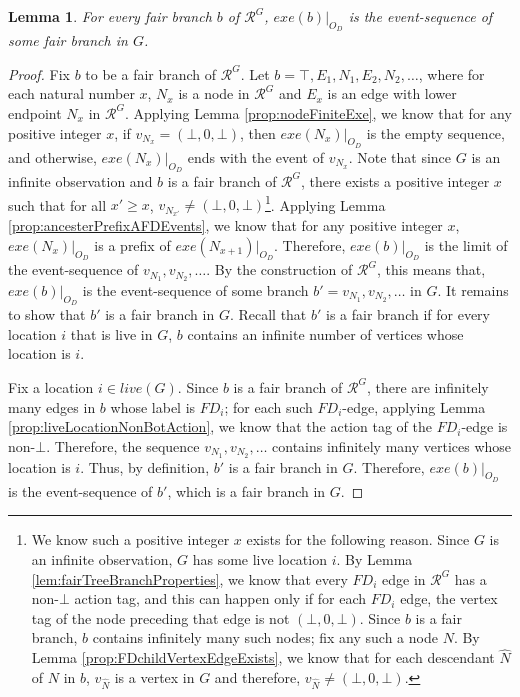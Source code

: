 \documentclass[11pt]{article}
\numberwithin{theorem}{section}
\newtheorem{lemma}[theorem]{Lemma}
\begin{document}
\begin{lemma}
\label{lem:fairBranchEventSequence}
For every fair branch $b$ of $\mathcal{R}^{G}$, $exe(b)|_{O_D}$ is the
event-sequence of some fair branch in $G$.
\end{lemma}
\begin{proof}
Fix $b$ to  be a fair branch of $\mathcal{R}^{G}$.
Let $b = \top,E_1,N_1,E_2,N_2,\ldots$, where for each natural number $x$, $N_x$ is a node in $\mathcal{R}^G$ and $E_x$ is an edge with lower endpoint $N_x$ in $\mathcal{R}^G$.
Applying Lemma \ref{prop:nodeFiniteExe}, we know that
for any positive integer $x$, if $v_{N_x} = (\bot, 0, \bot)$, then $exe(N_x)|_{O_D}$ is the empty sequence, and otherwise, $exe(N_x)|_{O_D}$ ends with the event of 
$v_{N_x}$. Note that since $G$ is an infinite observation and $b$ is a fair branch of $\mathcal{R}^{G}$, there exists a positive integer $x$ such that for all $x' \geq x$, $v_{N_{x'}} \neq (\bot, 0, \bot)$\footnote{
We know such a positive integer $x$ exists for the following reason. Since $G$ is an infinite observation, $G$ has some live location $i$. By Lemma \ref{lem:fairTreeBranchProperties}, we know that every $FD_i$ edge in $\mathcal{R}^G$ has a non-$\bot$ action tag, and this can happen only if for each $FD_i$ edge, the vertex tag of the node preceding that edge is not $(\bot, 0, \bot)$. Since $b$ is a fair branch, $b$ contains infinitely many such nodes; fix any such a node $N$. By Lemma \ref{prop:FDchildVertexEdgeExists}, we know that for each descendant $\hat{N}$ of $N$ in $b$, $v_{\hat{N}}$ is a vertex in $G$ and therefore, $v_{\hat{N}} \neq (\bot, 0, \bot)$.}.
Applying Lemma \ref{prop:ancesterPrefixAFDEvents}, we
know that for any positive integer $x$, $exe(N_x)|_{O_D}$ is a prefix of
$exe(N_{x+1})|_{O_D}$. Therefore, $exe(b)|_{O_D}$ is the limit of the event-sequence of 
$v_{N_1},v_{N_2},\ldots$. By the construction of $\mathcal{R}^G$, this means that, $exe(b)|_{O_D}$ is the
event-sequence of some branch $b' = v_{N_1},v_{N_2},\ldots$ in $G$. It
remains to show that $b'$ is a fair branch in $G$. 
Recall that $b'$ is a fair branch if for every location $i$ that is live in $G$, $b$ contains an infinite number of vertices whose location is $i$.

Fix a location $i \in live(G)$. Since $b$ is a fair branch of $\mathcal{R}^G$, there are infinitely many edges in $b$ whose
label is $FD_i$; for each such $FD_i$-edge, applying Lemma
\ref{prop:liveLocationNonBotAction}, we know that the action tag of
the $FD_i$-edge is non-$\bot$. Therefore, the sequence $v_{N_1},v_{N_2},\ldots$ contains infinitely many
vertices whose location is $i$. Thus, by definition, $b'$ is a fair branch
in $G$. Therefore, $exe(b)|_{O_D}$ is the event-sequence of $b'$, which is a fair
branch in $G$.
\end{proof}
\end{document}
